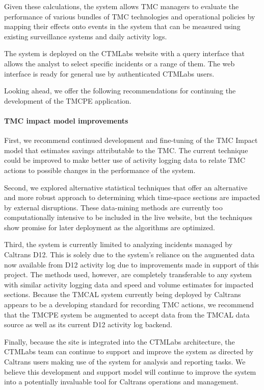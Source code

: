 \documentclass[12pt]{report}
\newcounter{time}
\newcounter{space}
\begin{document}
Given these calculations, the system allows \ac{TMC} managers to evaluate the
performance of various bundles of \ac{TMC} technologies and operational policies
by mapping their effects onto events in the system that can be measured using
existing surveillance systems and daily activity logs.  

The system is deployed on the \ac{CTMLabs} website with a query interface that
allows the analyst to select specific incidents or a range of them.  The web
interface is ready for general use by authenticated \ac{CTMLabs} users.

Looking ahead, we offer the following recommendations for continuing the
development of the \ac{TMCPE} application.  

\paragraph{TMC impact model improvements}

First, we recommend continued development and fine-tuning of the TMC Impact
model that estimates savings attributable to the \ac{TMC}.  The current
technique could be improved to make better use of activity logging data to
relate \ac{TMC} actions to possible changes in the performance of the system.  

Second, we explored alternative statistical techniques that
offer an alternative and more robust approach to determining which time-space
sections are impacted by external disruptions.  These data-mining methods
are currently too computationally intensive to be included in the live website,
but the techniques show promise for later deployment as the algorithms are
optimized.

Third, the system is currently limited to analyzing incidents managed by
Caltrans \ac{D12}.  This is solely due to the system's reliance on the augmented
data now available from \ac{D12} activity log due to improvements made in
support of this project.  The methods used, however, are completely transferable
to any system with similar activity logging data and speed and volume estimates
for impacted sections.  Because the \ac{TMCAL} system currently being deployed
by Caltrans appears to be a developing standard for recording \ac{TMC} actions,
we recommend that the \ac{TMCPE} system be augmented to accept data from the
\ac{TMCAL} data source as well as its current \ac{D12} activity log backend.

Finally, because the site is integrated into the \ac{CTMLabs} architecture, the
\ac{CTMLabs} team can continue to support and improve the system as directed by
Caltrans users making use of the system for analysis and reporting tasks.  We
believe this development and support model will continue to improve the system
into a potentially invaluable tool for Caltrans operations and management.
\end{document}
